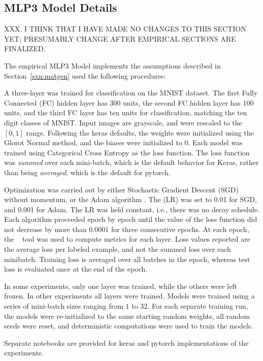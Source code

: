 

\subsection{MLP3 Model Details}
\label{sxn:appendix_MLP3details}


XXX.  I THINK THAT I HAVE MADE NO CHANGES TO THIS SECTION YET; PRESUMABLY CHANGE AFTER EMPIRICAL SECTIONS ARE FINALIZED.

The empirical MLP3 Model implements the assumptions described in Section~\ref{sxn:matgen} used the following 
procedures:

A three-layer \MultiLayerPerceptron was trained for classification on the MNIST dataset\cite{MNIST1998}. The first Fully 
Connected (FC) hidden layer has 300 units, the second FC hidden layer has 100 units, and the third FC layer has ten 
units for classification, matching the ten digit classes of MNIST. Input images are grayscale, and were rescaled to the 
$[0, 1]$ range. Following the keras\cite{keras2015} defaults, the weights were initialized using the Glorot 
Normal\cite{GloBen10} method, and the biases were initialized to $0$. Each model was trained using Categorical Cross 
Entropy as the loss function. The loss function was {\em summed} over each mini-batch, which is the default behavior for 
Keras, rather than being {\em averaged}, which is the default for pytorch\cite{pytorch2019}. 

Optimization was carried out by either Stochastic Gradient Descent (SGD) 
without momentum, or the Adam algorithm \cite{kingma2014_TR}. The \LearningRate (LR) was set to 0.01 for SGD, and 0.001 
for Adam. The LR was held constant, i.e., there was no decay schedule. Each algorithm proceeded epoch by epoch until the 
value of the loss function did not decrease by more than 0.0001 for three consecutive epochs. At each epoch, 
the \WW~ tool was used to compute metrics for each layer. Loss values reported are the average loss per labeled example, 
and not the summed loss over each minibatch. Training loss is averaged over all batches in the epoch, whereas test loss 
is evaluated once at the end of the epoch.

In some experiments, only one layer was trained, while the others were left frozen. In other experiments all layers were 
trained. Models were trained using a series of mini-batch sizes ranging from $1$ to $32$. For each separate training 
run, the models were re-initialized to the same starting random weights, all random seeds were reset, and deterministic 
computations were used to train the models.

Separate notebooks are provided for keras and pytorch implementations of the experiments.


